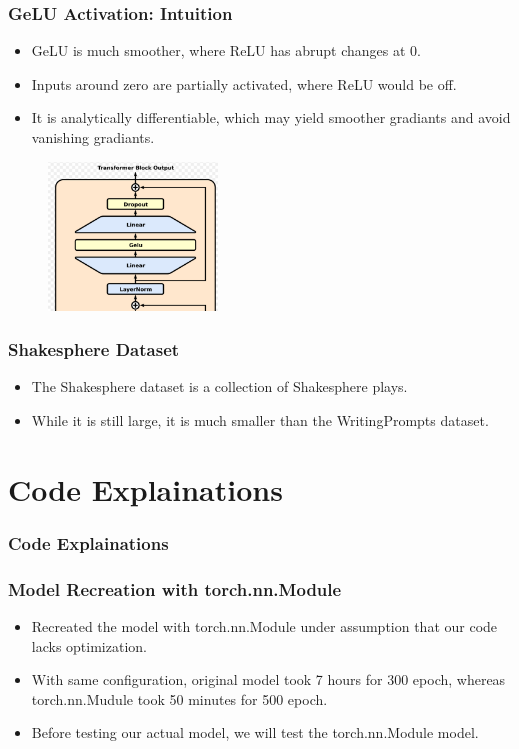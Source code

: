 \documentclass[
    10pt %
    16:9, %
]{beamer}
\begin{document}
\frame 
{
  \frametitle{GeLU Activation: Intuition}
  \begin{itemize}
    \item GeLU is much smoother, where ReLU has abrupt changes at 0.
    \item Inputs around zero are partially activated, where ReLU would be off.
    \item It is analytically differentiable, which may yield smoother gradiants and avoid vanishing gradiants.
  \end{itemize}
  \begin{figure}[h]
    \centering
    \includegraphics[width=0.4\textwidth]{GeLU.png}
  \end{figure}
}

\frame
{
  \frametitle{Shakesphere Dataset}
  \begin{itemize}
    \item The Shakesphere dataset is a collection of Shakesphere plays.
    \item While it is still large, it is much smaller than the WritingPrompts dataset.
  \end{itemize}
}

\section{Code Explainations}

\frame
{
  \frametitle{Code Explainations}
}

\frame 
{
  \frametitle{Model Recreation with torch.nn.Module}
  \begin{itemize}
    \item Recreated the model with torch.nn.Module under assumption that our code lacks optimization.
    \item With same configuration, original model took 7 hours for 300 epoch, whereas torch.nn.Mudule took 50 minutes for 500 epoch.
    \item Before testing our actual model, we will test the torch.nn.Module model.
  \end{itemize}
}
\end{document}
